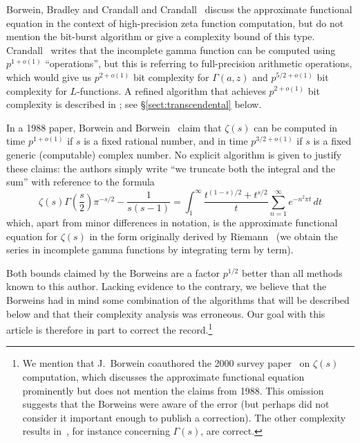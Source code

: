 \documentclass[reqno]{amsart}
\newcommand{\be}{\begin{equation}}
\newcommand{\ee}{\end{equation}}
\theoremstyle{definition}
\begin{document}
Borwein, Bradley and Crandall \cite{BorweinBradleyCrandall2000}
and Crandall~\cite{crandall2012unified,bailey2015crandall} discuss
the approximate functional equation in the context of high-precision
zeta function computation,
but do not mention the bit-burst algorithm or give a complexity
bound of this type. Crandall~\cite{crandall2012unified} writes that the incomplete gamma function
can be computed using $p^{1+o(1)}$ ``operations'', but this
is referring to full-precision arithmetic operations,
which would give us $p^{2+o(1)}$ bit complexity for $\Gamma(a,z)$
and $p^{5/2+o(1)}$ bit complexity for $L$-functions.
A refined algorithm that achieves $p^{2+o(1)}$ bit complexity is described in \cite[\S 7]{BorweinBradleyCrandall2000};
see \S \ref{sect:transcendental} below.

In a 1988 paper, Borwein and Borwein~\cite{Borwein1988} claim
that $\zeta(s)$ can be computed in time $p^{1+o(1)}$
if $s$ is a fixed rational number, and in time $p^{3/2+o(1)}$
if $s$ is a fixed generic (computable) complex number.
No explicit algorithm is given to justify these claims: the authors
simply write ``we truncate both the integral and the sum''
with reference to the formula
\be
\zeta(s) \Gamma\left(\frac{s}{2}\right) \pi^{-s/2} - \frac{1}{s(s-1)} = \int_{1}^{\infty} \frac{t^{(1-s)/2} + t^{s/2}}{t} \sum_{n=1}^{\infty} e^{-n^2 \pi t} \, dt
\label{eq:fetheta}
\ee
which, apart from minor differences in notation, is the approximate functional equation for
$\zeta(s)$ in the form originally derived by Riemann~\cite{riemann1859ueber}
(we obtain the series in incomplete gamma functions by integrating term by term).

Both bounds claimed by the Borweins are a factor $p^{1/2}$ better than all methods
known to this author.
Lacking evidence to the contrary, we believe that the Borweins had in mind some
combination of the
algorithms that will be described below
and that their complexity analysis was erroneous.
Our goal with this article is therefore in part to correct the record.\footnote{We mention that J.~Borwein
coauthored the 2000 survey paper~\cite{BorweinBradleyCrandall2000}
on $\zeta(s)$ computation, which discusses the
approximate functional equation prominently but does not mention the
claims from 1988. This omission suggests that the Borweins were aware
of the error (but perhaps did not consider it
important enough to publish a correction).
The other complexity results in~\cite{Borwein1988},
for instance concerning $\Gamma(s)$, are correct.}
\end{document}
